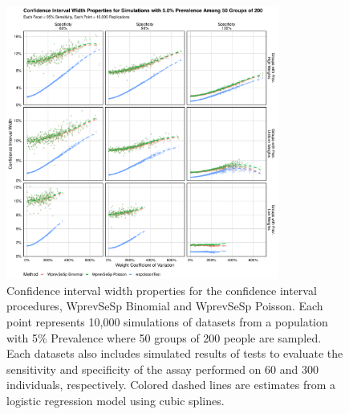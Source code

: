 \documentclass[AMA,STIX1COL]{WileyNJD-v2}
\begin{document}
\begin{figure}
\centering
\includegraphics[width=0.8\textwidth]{figures/imperfect_confidence_interval_width_50_groups_0_05_prev}
\caption{Confidence interval width properties for the confidence interval procedures, WprevSeSp Binomial and WprevSeSp Poisson.
Each point represents 10,000 simulations of datasets from a population with 5\% Prevalence where 50 groups of 200 people are sampled.
Each datasets also includes simulated results of tests to evaluate the sensitivity and specificity of the assay performed on 60 and 300 individuals, respectively.
Colored dashed lines are estimates from a logistic regression model using cubic splines.}
\label{fig:imperfect_confidence_interval_width_50_groups_0_05_prev}
\end{figure}
\end{document}
